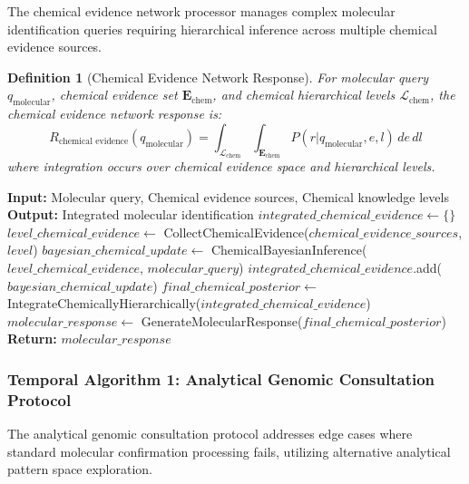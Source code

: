 \documentclass[11pt,a4paper]{article}
\newtheorem{definition}[theorem]{Definition}
\theoremstyle{remark}
\begin{document}
{{{{{{{{{{The chemical evidence network processor manages complex molecular identification queries requiring hierarchical inference across multiple chemical evidence sources.

\begin{definition}[Chemical Evidence Network Response]
For molecular query $q_{\text{molecular}}$, chemical evidence set $\mathbf{E}_{\text{chem}}$, and chemical hierarchical levels $\mathcal{L}_{\text{chem}}$, the chemical evidence network response is:
\begin{equation}
R_{\text{chemical evidence}}(q_{\text{molecular}}) = \int_{\mathcal{L}_{\text{chem}}} \int_{\mathbf{E}_{\text{chem}}} P(r | q_{\text{molecular}}, e, l) \, de \, dl
\end{equation}
where integration occurs over chemical evidence space and hierarchical levels.
\end{definition}

\begin{algorithm}[H]
\caption{Sachikonye's Chemical Evidence Network Algorithm 2}
\begin{algorithmic}[1]
\State \textbf{Input:} Molecular query, Chemical evidence sources, Chemical knowledge levels
\State \textbf{Output:} Integrated molecular identification
    \State $integrated\_chemical\_evidence \gets \{\}$
        \State $level\_chemical\_evidence \gets$ CollectChemicalEvidence($chemical\_evidence\_sources$, $level$)
        \State $bayesian\_chemical\_update \gets$ ChemicalBayesianInference($level\_chemical\_evidence$, $molecular\_query$)
        \State $integrated\_chemical\_evidence$.add($bayesian\_chemical\_update$)
    \EndFor
    \State $final\_chemical\_posterior \gets$ IntegrateChemicallyHierarchically($integrated\_chemical\_evidence$)
    \State $molecular\_response \gets$ GenerateMolecularResponse($final\_chemical\_posterior$)
    \State \textbf{Return:} $molecular\_response$
\EndProcedure
\end{algorithmic}
\end{algorithm}

\subsubsection{Temporal Algorithm 1: Analytical Genomic Consultation Protocol}

The analytical genomic consultation protocol addresses edge cases where standard molecular confirmation processing fails, utilizing alternative analytical pattern space exploration.

}}}}}}}}}}
\end{document}
